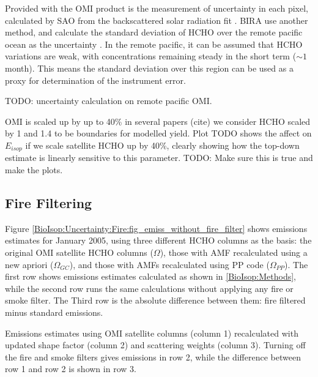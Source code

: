     
    Provided with the OMI product is the measurement of uncertainty in each pixel, calculated by SAO from the backscattered solar radiation fit \parencite{Abad2015,Abad2016}.
    BIRA use another method, and calculate the standard deviation of HCHO over the remote pacific ocean as the uncertainty \parencite{DeSmedt2012, DeSmedt2015}.
    In the remote pacific, it can be assumed that HCHO variations are weak, with concentrations remaining steady in the short term ($\sim 1$ month).
    This means the standard deviation over this region can be used as a proxy for determination of the instrument error.
    
    
    TODO: uncertainty calculation on remote pacific OMI.
    
    OMI is scaled up by up to 40\% in several papers (cite) we consider HCHO scaled by 1 and 1.4 to be boundaries for modelled yield.
    Plot TODO shows the affect on $E_{isop}$ if we scale satellite HCHO up by 40\%, clearly showing how the top-down estimate is linearly sensitive to this parameter. TODO: Make sure this is true and make the plots.
    
  \subsection{Fire Filtering}
    
    Figure \ref{BioIsop:Uncertainty:Fire:fig_emiss_without_fire_filter} shows emissions estimates for January 2005, using three different HCHO columns as the basis: the original OMI satellite HCHO columns ($\Omega$), those with AMF recalculated using a new apriori ($\Omega_{GC}$), and those with AMFs recalculated using PP code ($\Omega_{PP}$).
    The first row shows emissions estimates calculated as shown in \ref{BioIsop:Methods}, while the second row runs the same calculations without applying any fire or smoke filter.
    The Third row is the absolute difference between them: fire filtered minus standard emissions.
    
    {Emissions estimates using OMI satellite columns (column 1) recalculated with updated shape factor (column 2) and scattering weights (column 3). Turning off the fire and smoke filters gives emissions in row 2, while the difference between row 1 and row 2 is shown in row 3.}
    {\label{BioIsop:Uncertainty:Fire:fig_emiss_without_fire_filter}}
    
  
